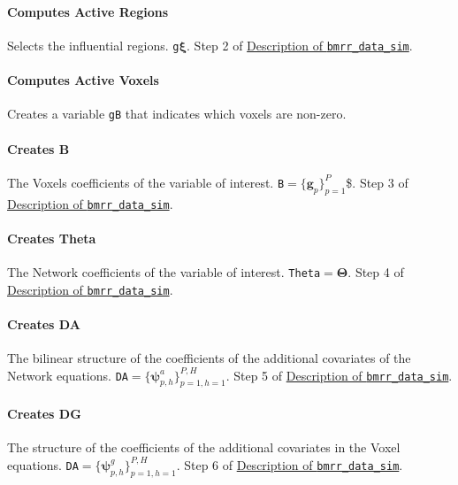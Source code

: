 \documentclass[
]{article}
\begin{document}
\paragraph{Computes Active Regions}\label{computes-active-regions}

Selects the influential regions. \texttt{g}\( {\boldsymbol \xi} \). Step 2 of
\hyperref[data_sim_description]{Description of \texttt{bmrr\_data\_sim}}.

\paragraph{Computes Active Voxels}\label{computes-active-voxels}

Creates a variable \texttt{gB} that indicates which voxels are non-zero.

\paragraph{Creates B}\label{creates-b}

The Voxels coefficients of the variable of interest. \texttt{B}\(=\{ {\boldsymbol g} _p\}_{p=1}^P\)\$.
Step 3 of \hyperref[data_sim_description]{Description of \texttt{bmrr\_data\_sim}}.

\paragraph{Creates Theta}\label{creates-theta}

The Network coefficients of the variable of interest. \texttt{Theta}\(= {\boldsymbol \Theta} \).
Step 4 of \hyperref[data_sim_description]{Description of \texttt{bmrr\_data\_sim}}.

\paragraph{Creates DA}\label{creates-da}

The bilinear structure of the coefficients of the additional covariates of
the Network equations.
\texttt{DA}\(=\{ {\boldsymbol \psi} _{p,h}^a\}_{p=1,h=1}^{P,H}\).
Step 5 of \hyperref[data_sim_description]{Description of \texttt{bmrr\_data\_sim}}.

\paragraph{Creates DG}\label{creates-dg}

The structure of the coefficients of the additional covariates in the Voxel
equations. \texttt{DA}\(=\{ {\boldsymbol \psi} _{p,h}^g\}_{p=1,h=1}^{P,H}\).
Step 6 of \hyperref[data_sim_description]{Description of \texttt{bmrr\_data\_sim}}.
\end{document}
